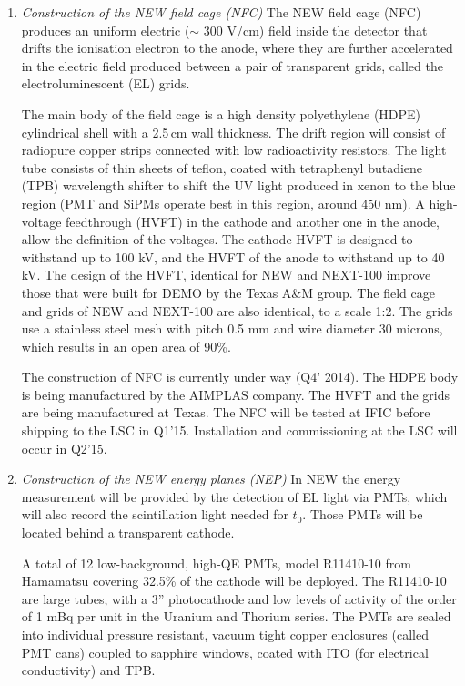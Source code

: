 \begin{enumerate}
\begin{enumerate}
\item {\em Construction of the NEW field cage (NFC)}
The NEW field cage (NFC) produces an uniform electric ($\sim$ 300 V/cm) field inside the  detector that drifts the ionisation electron to the anode, where they are further accelerated in the electric field produced between a pair of transparent grids, called the electroluminescent (EL) grids. 

The main body of the field cage is a high density polyethylene (HDPE) cylindrical shell with a 2.5\,cm wall thickness.  The drift region will consist of radiopure  copper strips connected with low radioactivity resistors.  The light tube consists of thin sheets of teflon, coated with tetraphenyl butadiene (TPB) wavelength shifter to shift the UV light produced in xenon to the blue region (PMT and SiPMs operate best in this region, around 450 nm).  A high-voltage feedthrough (HVFT) in the cathode and another one in the anode, allow the definition of the voltages. The cathode HVFT is designed to withstand up to 100 kV, and the HVFT of the anode to withstand up to 40 kV. The design of the HVFT, identical for NEW and NEXT-100 improve those that were built for DEMO by the Texas A\&M group. The field cage and grids of NEW and NEXT-100 are also identical, to a scale 1:2. The grids use a stainless steel mesh with pitch 0.5 mm and wire diameter 30 microns, which results in an open area of 90\%.  

The construction of NFC is currently under way (Q4' 2014). The HDPE body is being manufactured by the AIMPLAS company. The HVFT and the grids are being manufactured at Texas. The  NFC will be tested at IFIC before shipping to the LSC in Q1'15. Installation and commissioning at the LSC will occur in Q2'15. 

\item {\em Construction of the NEW energy planes (NEP)}
In NEW the energy measurement will be provided by the detection of EL light via PMTs, which will also record the scintillation light needed for $t_0$. Those PMTs will be located behind a transparent cathode.

A total of 12 low-background, high-QE PMTs, model R11410-10 from Hamamatsu covering 32.5\% of the cathode will be deployed. The R11410-10 are large tubes, with a 3'' photocathode and low levels of  activity of the order of 1 mBq per unit in the Uranium and Thorium series. The PMTs are sealed into individual pressure resistant, vacuum tight copper enclosures (called PMT cans) coupled to 
sapphire windows, coated with ITO (for electrical conductivity) and TPB. 


\end{enumerate}
\end{enumerate}

